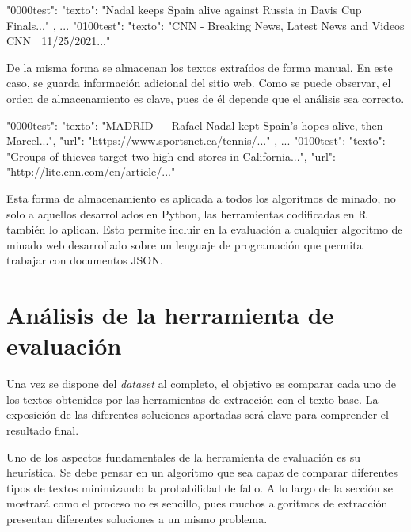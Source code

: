 \begin{Schunk}
  \begin{Soutput}
  {
    "0000test": {
        "texto": "Nadal keeps Spain alive against Russia in Davis Cup Finals..."
    },
    ...
    "0100test": {
        "texto": "CNN - Breaking News, Latest News and Videos CNN | 11/25/2021..."
    }
  }
  \end{Soutput}
\end{Schunk}

De la misma forma se almacenan los textos extraídos de forma manual. En este caso, se guarda información
adicional del sitio web. Como se puede observar, el orden de almacenamiento es clave, pues de él depende
que el análisis sea correcto.

\begin{Schunk}
  \begin{Soutput}
  {
    "0000test": {
        "texto": "MADRID — Rafael Nadal kept Spain’s hopes alive, then Marcel...",
        "url": "https://www.sportsnet.ca/tennis/..."
    },
    ...
    "0100test": {
      "texto": "Groups of thieves target two high-end stores in California...",
      "url": "http://lite.cnn.com/en/article/..."
    }
  }
  \end{Soutput}
\end{Schunk}

Esta forma de almacenamiento es aplicada a todos los algoritmos de minado, no solo a aquellos desarrollados
en Python, las herramientas codificadas en R también lo aplican. Esto permite incluir en la evaluación a
cualquier algoritmo de minado web desarrollado sobre un lenguaje de programación que permita trabajar con
documentos JSON.

\section{Análisis de la herramienta de evaluación}
\label{sec:analisis de la herramienta de evaluacion}

Una vez se dispone del \emph{dataset} al completo, el objetivo es comparar cada uno de los textos obtenidos
por las herramientas de extracción con el texto base. La exposición de las diferentes soluciones aportadas
será clave para comprender el resultado final.

Uno de los aspectos fundamentales de la herramienta de evaluación es su heurística. Se debe pensar en un
algoritmo que sea capaz de comparar diferentes tipos de textos minimizando la probabilidad de fallo. A lo
largo de la sección se mostrará como el proceso no es sencillo, pues muchos algoritmos de extracción
presentan diferentes soluciones a un mismo problema.

